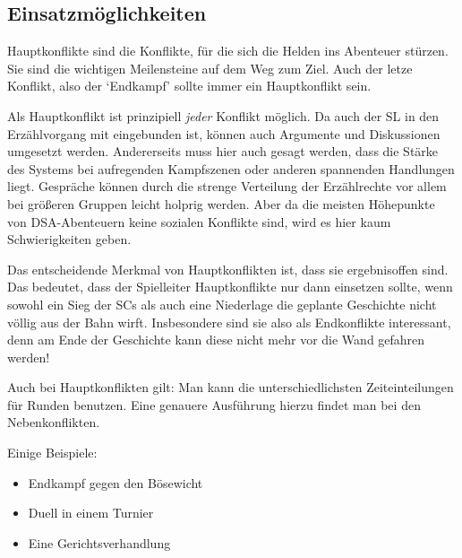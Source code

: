 \subsection{Einsatzmöglichkeiten}
Hauptkonflikte sind die Konflikte, für die sich die Helden ins Abenteuer stürzen. Sie sind die wichtigen Meilensteine auf dem Weg zum Ziel. Auch der letze Konflikt, also der `Endkampf' sollte immer ein Hauptkonflikt sein.

Als Hauptkonflikt ist prinzipiell \emph{jeder} Konflikt möglich. Da auch der SL in den Erzählvorgang mit eingebunden ist, können auch Argumente und Diskussionen umgesetzt werden. Andererseits muss hier auch gesagt werden, dass die Stärke des Systems bei aufregenden Kampfszenen oder anderen spannenden Handlungen liegt. Gespräche können durch die strenge Verteilung der Erzählrechte vor allem bei größeren Gruppen leicht holprig werden. Aber da die meisten Höhepunkte von DSA-Abenteuern keine sozialen Konflikte sind, wird es hier kaum Schwierigkeiten geben.

Das entscheidende Merkmal von Hauptkonflikten ist, dass sie ergebnisoffen sind. Das bedeutet, dass der Spielleiter Hauptkonflikte nur dann einsetzen sollte, wenn sowohl ein Sieg der SCs als auch eine Niederlage die geplante Geschichte nicht völlig aus der Bahn wirft. Insbesondere sind sie also als Endkonflikte interessant, denn am Ende der Geschichte kann diese nicht mehr vor die Wand gefahren werden!

Auch bei Hauptkonflikten gilt: Man kann die unterschiedlichsten Zeiteinteilungen für Runden benutzen. Eine genauere Ausführung hierzu findet man bei den Nebenkonflikten.

\begin{beispiel}
Einige Beispiele:
\begin{itemize}
  \item Endkampf gegen den Bösewicht
  \item Duell in einem Turnier
  \item Eine Gerichtsverhandlung
\end{itemize}
\end{beispiel}

